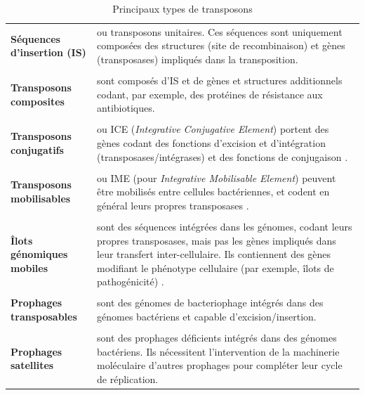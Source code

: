 \begin{longtable}{@{\hspace{-2.5cm}\hspace{1cm}}p{} | p{}}
	\caption{Principaux types de transposons}\label{transposon}\\
	\endfirsthead
	\textbf{Séquences d'insertion (IS)} & ou transposons unitaires. Ces séquences sont uniquement composées des structures (site de recombinaison) et gènes (transposases) impliqués dans la transposition.\\
	\\[-0.2cm]
	\textbf{Transposons composites} & sont composés d'IS et de gènes et structures additionnels codant, par exemple, des protéines de résistance aux antibiotiques.\\
	\\[-0.2cm]
	\textbf{Transposons conjugatifs} & ou ICE (\textit{Integrative Conjugative Element}) portent des gènes codant des fonctions d'excision et d'intégration (transposases/intégrases) et des fonctions de conjugaison \citep{Wozniak2010}.\\
	\\[-0.2cm]
	\textbf{Transposons mobilisables} & ou IME (pour \textit{Integrative Mobilisable Element}) peuvent être mobilisés entre cellules bactériennes, et codent en général leurs propres transposases \citep{Roberts2008}.\\
	\\[-0.2cm]
	\textbf{Îlots génomiques mobiles} & sont des séquences intégrées dans les génomes, codant leurs propres transposases, mais pas les gènes impliqués dans leur transfert inter-cellulaire. Ils contiennent des gènes modifiant le phénotype cellulaire (par exemple, îlots de pathogénicité) \citep{Boyd2009}.\\
	\\[-0.2cm]
	\textbf{Prophages transposables} & sont des génomes de bacteriophage intégrés dans des génomes bactériens et capable d'excision/insertion.\\
	\\[-0.2cm]
	\textbf{Prophages satellites} & sont des prophages déficients intégrés dans des génomes bactériens. Ils nécessitent l'intervention de la machinerie moléculaire d'autres prophages pour compléter leur cycle de réplication.\\
 \end{longtable}
 
